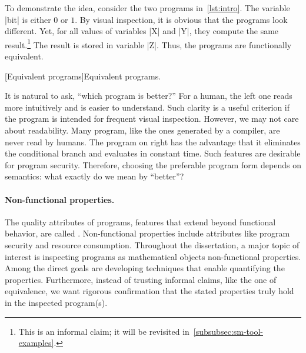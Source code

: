 To demonstrate the idea, consider the two programs in~\autoref{lst:intro}. The
variable \pr|bit| is either \(0\) or \(1\). By visual inspection, it is obvious
that the programs look different. Yet, for all values of variables \pr|X| and
\pr|Y|, they compute the same result.\footnote{This is an informal claim; it
will be revisited in~\autoref{subsubsec:sm-tool-examples}.} The result is stored
in variable \pr|Z|. Thus, the programs are functionally equivalent.

\begin{center}
\captionsetup{type=lstlisting}
\begin{minipage}{.3\textwidth}

\end{minipage}%
\hspace{5em}%
\begin{minipage}{.4\textwidth}
\captionsetup{type=lstlisting}

\end{minipage}
[Equivalent programs]{Equivalent programs.}
\label{lst:intro}
\end{center}

It is natural to ask, {\enquote{which program is better?}} For a human, the left
one reads more intuitively and is easier to understand. Such clarity is a useful
criterion if the program is intended for frequent visual inspection. However, we
may not care about readability. Many program, like the ones generated by a
compiler, are never read by humans. The program on right has the advantage that
it eliminates the conditional branch and evaluates in {constant time}. Such
features are desirable for program security. Therefore, choosing the preferable
program form depends on semantics: what exactly do we mean by \enquote{better}?

\paragraph{Non-functional properties.}
The quality attributes of programs, \ie features that extend beyond functional
behavior, are called \emph{}. Non-functional
properties include attributes like program security and resource consumption.
Throughout the dissertation, a major topic of interest is inspecting programs as
mathematical objects \wrt non-functional properties. Among the direct goals are
developing techniques that enable quantifying the properties. Furthermore,
instead of trusting informal claims, like the one of equivalence, we want
rigorous confirmation that the stated properties truly hold in the inspected
program(s).

